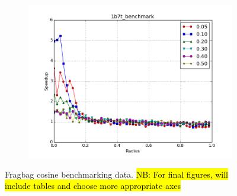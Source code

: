 \documentclass[review,preprint,12pt]{elsarticle}
\theoremstyle{definition}
\theoremstyle{remark}
\numberwithin{equation}{section}
\begin{document}
\begin{figure}[tbp]
\begin{subfigure}[b]{0.49\textwidth}
        \includegraphics[width=1\textwidth]{assets/1b7t_benchmark_cosine}
        \caption{}
    \end{subfigure}
    \caption{Fragbag cosine benchmarking data. \hl{NB: For final figures, will include tables and choose more appropriate axes}}
    \label{fig:fragbag_cosine}
\end{figure}
\end{document}
